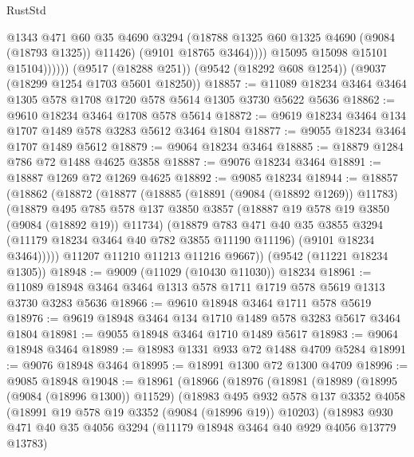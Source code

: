 \begin{lexlean}{RustStd}
\begin{coremodule}
                      @1343
                      @471
                      @60
                      @35
                      @4690
                      @3294
                      (@18788 @1325 @60 @1325 @4690 (@9084 (@18793 @1325)) @11426)
                      (@9101 @18765 @3464))))
                @15095
                @15098
                @15101
                @15104))))))
    (@9517 (@18288 @251))
    (@9542 (@18292 @608 @1254))
    (@9037 (@18299 @1254 @1703 @5601 @18250))
@18857 := @11089 @18234 @3464 @3464 @1305 @578 @1708 @1720 @578 @5614 @1305 @3730 @5622 @5636
@18862 := @9610 @18234 @3464 @1708 @578 @5614
@18872 := @9619 @18234 @3464 @134 @1707 @1489 @578 @3283 @5612 @3464 @1804
@18877 := @9055 @18234 @3464 @1707 @1489 @5612
@18879 := @9064 @18234 @3464
@18885 := @18879 @1284 @786 @72 @1488 @4625 @3858
@18887 := @9076 @18234 @3464
@18891 := @18887 @1269 @72 @1269 @4625
@18892 := @9085 @18234
@18944 := @18857
    (@18862
      (@18872
        (@18877
          (@18885
            (@18891 (@9084 (@18892 @1269)) @11783)
            (@18879
              @495
              @785
              @578
              @137
              @3850
              @3857
              (@18887 @19 @578 @19 @3850 (@9084 (@18892 @19)) @11734)
              (@18879
                @783
                @471
                @40
                @35
                @3855
                @3294
                (@11179 @18234 @3464 @40 @782 @3855 @11190 @11196)
                (@9101 @18234 @3464)))))
        @11207
        @11210
        @11213
        @11216
        @9667))
    (@9542 (@11221 @18234 @1305))
@18948 := @9009 (@11029 (@10430 @11030)) @18234
@18961 := @11089 @18948 @3464 @3464 @1313 @578 @1711 @1719 @578 @5619 @1313 @3730 @3283 @5636
@18966 := @9610 @18948 @3464 @1711 @578 @5619
@18976 := @9619 @18948 @3464 @134 @1710 @1489 @578 @3283 @5617 @3464 @1804
@18981 := @9055 @18948 @3464 @1710 @1489 @5617
@18983 := @9064 @18948 @3464
@18989 := @18983 @1331 @933 @72 @1488 @4709 @5284
@18991 := @9076 @18948 @3464
@18995 := @18991 @1300 @72 @1300 @4709
@18996 := @9085 @18948
@19048 := @18961
    (@18966
      (@18976
        (@18981
          (@18989
            (@18995 (@9084 (@18996 @1300)) @11529)
            (@18983
              @495
              @932
              @578
              @137
              @3352
              @4058
              (@18991 @19 @578 @19 @3352 (@9084 (@18996 @19)) @10203)
              (@18983
                @930
                @471
                @40
                @35
                @4056
                @3294
                (@11179 @18948 @3464 @40 @929 @4056 @13779 @13783)

\end{coremodule}
\end{lexlean}
